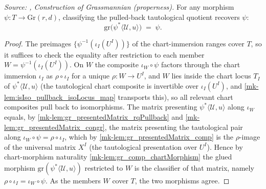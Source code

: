 \begin{lemma}\label{mk-lem:gr_grPointOfRankQuotient_rqPullback_tautological}
  \leanok

  \textit{Source: \cite{nitsure-hilbert-quot}, Construction of Grassmannian (properness).}
  For any morphism \(\psi : T \to \mathrm{Gr}(r,d)\), classifying the pulled-back tautological
  quotient recovers \(\psi\):
  \[
    \mathrm{gr}\bigl(\psi^{*}\langle \mathcal{U}, u\rangle\bigr) \;=\; \psi .
  \]
\end{lemma}
\begin{proof}
  The preimages \(\{\psi^{-1}(\iota_I(U^I))\}\) of the chart-immersion ranges cover \(T\), so
  it suffices to check the equality after restriction to each member \(W = \psi^{-1}
  (\iota_I(U^I))\). On \(W\) the composite \(\iota_W\circ\psi\) factors through the chart
  immersion \(\iota_I\) as \(\rho\circ\iota_I\) for a unique \(\rho : W \to U^I\), and \(W\)
  lies inside the chart locus \(T_I\) of \(\psi^{*}\langle\mathcal{U},u\rangle\) (the
  tautological chart composite is invertible over \(\iota_I(U^I)\), and
  \ref{mk-lem:isIso_pullback_isoLocus_map} transports this), so all relevant chart composites
  pull back to isomorphisms. The matrix presenting \(\psi^{*}\langle\mathcal{U},u\rangle\)
  along \(\iota_W\) equals, by \ref{mk-lem:gr_presentedMatrix_rqPullback} and
  \ref{mk-lem:gr_presentedMatrix_congr}, the matrix presenting the tautological pair along
  \(\iota_W\circ\psi = \rho\circ\iota_I\), which by \ref{mk-lem:gr_presentedMatrix_comp} is the
  \(\rho\)-image of the universal matrix \(X^I\) (the tautological presentation over \(U^I\)).
  Hence by chart-morphism naturality \ref{mk-lem:gr_comp_chartMorphism} the glued morphism
  \(\mathrm{gr}(\psi^{*}\langle\mathcal{U},u\rangle)\) restricted to \(W\) is the classifier of
  that matrix, namely \(\rho\circ\iota_I = \iota_W\circ\psi\). As the members \(W\) cover
  \(T\), the two morphisms agree.
\end{proof}

